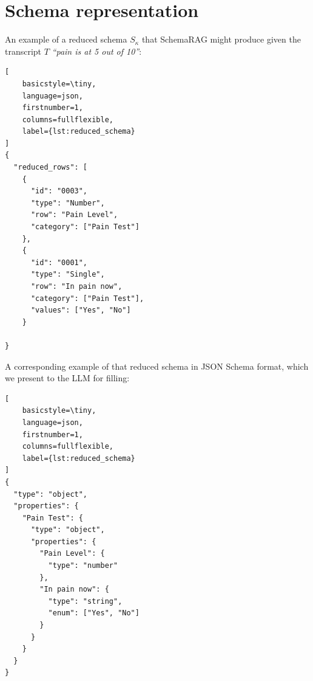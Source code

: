 \section{Schema representation}
\label{sec:schema_representation}


An example of a reduced schema $S_\kappa $ that SchemaRAG might produce given the transcript $T$ \textit{``pain is at 5 out of 10''}:

\begin{lstlisting}[
    basicstyle=\tiny,
    language=json,
    firstnumber=1,
    columns=fullflexible,
    label={lst:reduced_schema}
]
{
  "reduced_rows": [
    {
      "id": "0003",
      "type": "Number",
      "row": "Pain Level",
      "category": ["Pain Test"]
    },
    {
      "id": "0001",
      "type": "Single",
      "row": "In pain now",
      "category": ["Pain Test"],
      "values": ["Yes", "No"]
    }
 
}
\end{lstlisting}
A corresponding example of that reduced schema in JSON Schema format, which we present to the LLM for filling:
\begin{lstlisting}[
    basicstyle=\tiny,
    language=json,
    firstnumber=1,
    columns=fullflexible,
    label={lst:reduced_schema}
]
{
  "type": "object",
  "properties": {
    "Pain Test": {
      "type": "object",
      "properties": {
        "Pain Level": {
          "type": "number"
        },
        "In pain now": {
          "type": "string",
          "enum": ["Yes", "No"]
        }
      }
    }
  }
}
\end{lstlisting}